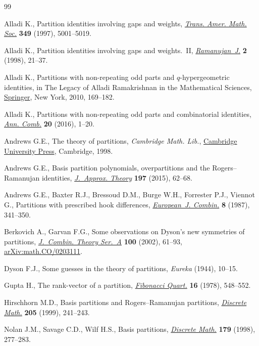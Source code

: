 \begin{thebibliography}{99}
\footnotesize\itemsep=0pt

Alladi K., Partition identities involving gaps and weights,
 \href{https://doi.org/10.1090/S0002-9947-97-01831-X}{\textit{Trans. Amer.
 Math. Soc.}} \textbf{349} (1997), 5001--5019.

Alladi K., Partition identities involving gaps and weights.~{II},
 \href{https://doi.org/10.1023/A:1009749606406}{\textit{Ramanujan~J.}}
 \textbf{2} (1998), 21--37.

Alladi K., Partitions with non-repeating odd parts and {$q$}-hypergeometric
 identities, in The Legacy of {A}lladi {R}amakrishnan in the Mathematical
 Sciences, \href{https://doi.org/10.1007/978-1-4419-6263-8_9}{Springer}, New
 York, 2010, 169--182.

Alladi K., Partitions with non-repeating odd parts and combinatorial
 identities, \href{https://doi.org/10.1007/s00026-015-0291-8}{\textit{Ann.
 Comb.}} \textbf{20} (2016), 1--20.

Andrews G.E., The theory of partitions, \textit{Cambridge Math. Lib.},
 \href{https://doi.org/10.1017/CBO9780511608650}{Cambridge University Press},
 Cambridge, 1998.

Andrews G.E., Basis partition polynomials, overpartitions and the
 {R}ogers--{R}amanujan identities,
 \href{https://doi.org/10.1016/j.jat.2014.05.008}{\textit{J.~Approx. Theory}}
 \textbf{197} (2015), 62--68.

Andrews G.E., Baxter R.J., Bressoud D.M., Burge W.H., Forrester P.J., Viennot
 G., Partitions with prescribed hook differences,
 \href{https://doi.org/10.1016/S0195-6698(87)80041-0}{\textit{European~J. Combin.}} \textbf{8} (1987), 341--350.

Berkovich A., Garvan F.G., Some observations on {D}yson's new symmetries of
 partitions, \href{https://doi.org/10.1006/jcta.2002.3281}{\textit{J.~Combin.
 Theory Ser.~A}} \textbf{100} (2002), 61--93,
 \href{http://arxiv.org/abs/math.CO/0203111}{arXiv:math.CO/0203111}.

Dyson F.J., Some guesses in the theory of partitions, \textit{Eureka} (1944),
 10--15.

Gupta H., The rank-vector of a partition,
 \href{https://doi.org/10.1080/00150517.1978.12430283}{\textit{Fibonacci
 Quart.}} \textbf{16} (1978), 548--552.

Hirschhorn M.D., Basis partitions and {R}ogers--{R}amanujan partitions,
 \href{https://doi.org/10.1016/S0012-365X(99)00030-8}{\textit{Discrete Math.}}
 \textbf{205} (1999), 241--243.

Nolan J.M., Savage C.D., Wilf H.S., Basis partitions,
 \href{https://doi.org/10.1016/S0012-365X(97)00101-5}{\textit{Discrete Math.}}
 \textbf{179} (1998), 277--283.

\end{thebibliography}
